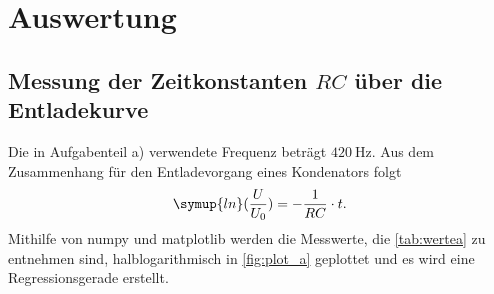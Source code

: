 \section{Auswertung}
\label{sec:Auswertung}

\subsection{Messung der Zeitkonstanten $RC$ über die Entladekurve}
Die in Aufgabenteil a) verwendete Frequenz beträgt $\SI{420}{\hertz}$. Aus dem Zusammenhang für den Entladevorgang eines Kondenators folgt
\begin{align}
    \symup{ln}(\frac{U}{U_{0}}) = -\frac{1}{RC}\cdot t.
\end{align}
Mithilfe von numpy \cite{numpy} und matplotlib \cite{matplotlib} werden die Messwerte, die
\autoref{tab:wertea} zu entnehmen sind, halblogarithmisch in \autoref{fig:plot_a} geplottet und es wird eine Regressionsgerade erstellt.

